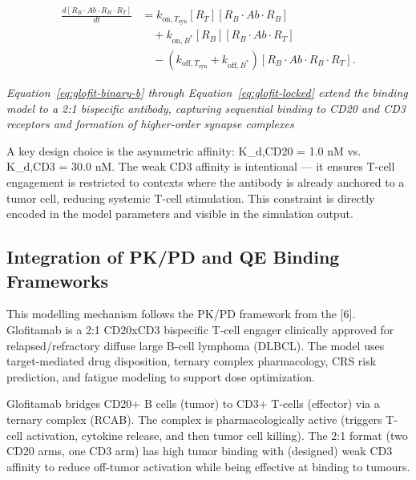 \documentclass[11pt]{article}
\begin{document}
\begin{equation}
\begin{aligned}
\frac{d[R_B\cdot Ab\cdot R_B\cdot R_T]}{dt} &= k_{\mathrm{on},T_{\mathrm{syn}}}[R_T][R_B\cdot Ab\cdot R_B]\\ &\quad+k_{\mathrm{on},B^{*}}[R_B][R_B\cdot Ab\cdot R_T]\\ &\quad-\left(k_{\mathrm{off},T_{\mathrm{syn}}}+k_{\mathrm{off},B^{*}}\right)[R_B\cdot Ab\cdot R_B\cdot R_T].
\end{aligned}
\label{eq:glofit-locked}
\end{equation}

\emph{Equation~\ref{eq:glofit-binary-b} through Equation~\ref{eq:glofit-locked} extend the binding model to a 2:1 bispecific antibody, capturing sequential binding to CD20 and CD3 receptors and formation of higher-order synapse complexes}
\par\medskip

A key design choice is the asymmetric affinity: K\_d,CD20 = 1.0 nM vs. K\_d,CD3 = 30.0 nM. The weak CD3 affinity is intentional — it ensures T-cell engagement is restricted to contexts where the antibody is already anchored to a tumor cell, reducing systemic T-cell stimulation. This constraint is directly encoded in the model parameters and visible in the simulation output.
\par\medskip

\subsection{Integration of PK/PD and QE Binding Frameworks}

This modelling mechanism follows the PK/PD framework from the [6]. Glofitamab is a 2:1 CD20xCD3 bispecific T-cell engager clinically approved for relapsed/refractory diffuse large B-cell lymphoma (DLBCL). The model uses target-mediated drug disposition, ternary complex pharmacology, CRS risk prediction, and fatigue modeling to support dose optimization.
\par\medskip

Glofitamab bridges CD20+ B cells (tumor) to CD3+ T-cells (effector) via a ternary complex (RCAB). The complex is pharmacologically active (triggers T-cell activation, cytokine release, and then tumor cell killing). The 2:1 format (two CD20 arms, one CD3 arm) has high tumor binding with (designed) weak CD3 affinity to reduce off-tumor activation while being effective at binding to tumours.
\par\medskip
\end{document}
